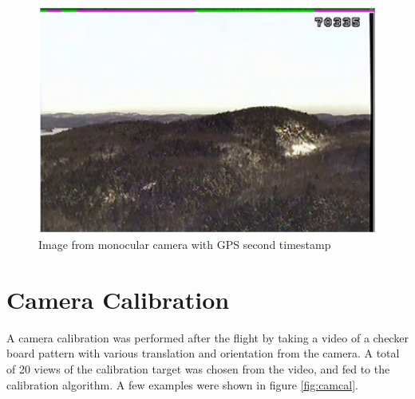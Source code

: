 \begin{figure}[h]
  \centering
  \includegraphics[width=12cm,keepaspectratio=true]{./Figures/video_snapshot.jpg}
  \caption{Image from monocular camera with GPS second timestamp}
  \label{fig:video_snapshot}
\end{figure}

\FloatBarrier

\section{Camera Calibration}\label{sec:camcal}
A camera calibration was performed after the flight by taking a video of a checker board pattern with various translation and orientation from the camera. A total of 20 views of the calibration target was chosen from the video, and fed to the calibration algorithm. A few examples were shown in figure \ref{fig:camcal}.

